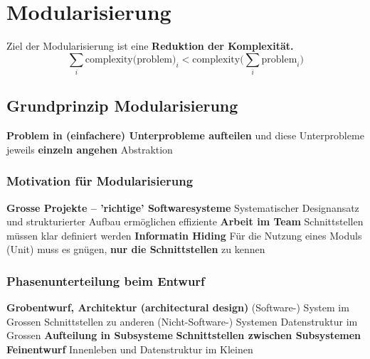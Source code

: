 \section{Modularisierung}

Ziel der Modularisierung ist eine \textbf{Reduktion der Komplexität.}
$$ \sum_{i} \text{complexity(problem)}_i < \text{complexity} \Big( \sum_{i} \text{problem}_i \Big) $$

\vspace{-0.2cm}


\subsection{Grundprinzip Modularisierung}

\begin{outline}
    \1 \textbf{Problem in (einfachere) Unterprobleme aufteilen} und diese Unterprobleme jeweils \textbf{einzeln angehen}
    \1 Abstraktion 
\end{outline}


\subsubsection{Motivation für Modularisierung}

\begin{outline}
    \1 \textbf{Grosse Projekte -- 'richtige' Softwaresysteme}
        \2 Systematischer Designansatz und strukturierter Aufbau ermöglichen effiziente \textbf{Arbeit im Team}
        \2 Schnittstellen müssen klar definiert werden
    \1 \textbf{Informatin Hiding}
        \2 Für die Nutzung eines Moduls (Unit) muss es gnügen, \textbf{nur die Schnittstellen} zu kennen
\end{outline}


\subsubsection{Phasenunterteilung beim Entwurf}

\begin{outline}
    \1 \textbf{Grobentwurf, Architektur (architectural design)}
        \2 (Software-) System im Grossen
        \2 Schnittstellen zu anderen (Nicht-Software-) Systemen
        \2 Datenstruktur im Grossen
        \2 \textbf{Aufteilung in Subsysteme}
        \2 \textbf{Schnittstellen zwischen Subsystemen}
    \1 \textbf{Feinentwurf}
        \2 Innenleben und Datenstruktur im Kleinen
\end{outline}


